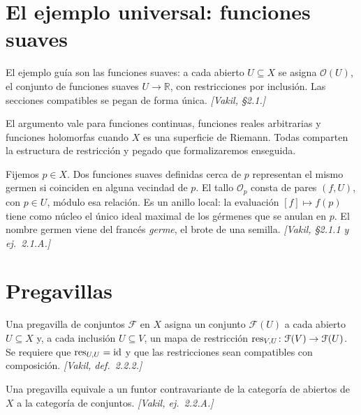 \section{El ejemplo universal: funciones suaves}

El ejemplo guía son las funciones suaves: a cada abierto $U\subseteq X$ se asigna $\mathcal O(U)$, el conjunto de funciones suaves $U\to\mathbb R$, con restricciones por inclusión. Las secciones compatibles se pegan de forma única. \emph{[Vakil, \S2.1.]}

\begin{obs}
\label{obs:s04-argumento-no-usa-funciones-sean}
El argumento vale para funciones continuas, funciones reales arbitrarias y funciones holomorfas cuando $X$ es una superficie de Riemann. Todas comparten la estructura de restricción y pegado que formalizaremos enseguida.
\end{obs}

\begin{ejem}
\label{ejem:s04-germen-funcion-suave-tallo}
Fijemos $p\in X$. Dos funciones suaves definidas cerca de $p$ representan el mismo germen si coinciden en alguna vecindad de $p$. El tallo $\mathcal O_p$ consta de pares $(f,U)$, con $p\in U$, módulo esa relación. Es un anillo local: la evaluación $[f]\mapsto f(p)$ tiene como núcleo el único ideal maximal de los gérmenes que se anulan en $p$. El nombre germen viene del francés \emph{germe}, el brote de una semilla. \emph{[Vakil, \S2.1.1 y ej.~2.1.A.]}
\end{ejem}

\section{Pregavillas}

\begin{defi}[Pregavilla]
\label{defi:s04-pregavilla}
Una pregavilla de conjuntos $\mathcal F$ en $X$ asigna un conjunto $\mathcal F(U)$ a cada abierto $U\subseteq X$ y, a cada inclusión $U\subseteq V$, un mapa de restricción $\operatorname{res}_{V,U}\colon \mathcal F(V)\to\mathcal F(U)$. Se requiere que $\operatorname{res}_{U,U}=\operatorname{id}$ y que las restricciones sean compatibles con composición. \emph{[Vakil, def.~2.2.2.]}
\end{defi}

\begin{obs}
\label{obs:s04-descripcion-categorica}
Una pregavilla equivale a un funtor contravariante de la categoría de abiertos de $X$ a la categoría de conjuntos. \emph{[Vakil, ej.~2.2.A.]}
\end{obs}

